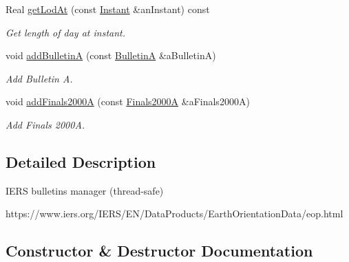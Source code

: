 \begin{DoxyCompactItemize}
Real \hyperlink{classlibrary_1_1physics_1_1coord_1_1frame_1_1provider_1_1iers_1_1_manager_a4d8b3d53fb06128050357682ee09d816}{get\+Lod\+At} (const \hyperlink{classlibrary_1_1physics_1_1time_1_1_instant}{Instant} \&an\+Instant) const
\begin{DoxyCompactList}\small\item\em Get length of day at instant. \end{DoxyCompactList}\item 
void \hyperlink{classlibrary_1_1physics_1_1coord_1_1frame_1_1provider_1_1iers_1_1_manager_a754e24a455c15f7d954718b0e6821e49}{add\+BulletinA} (const \hyperlink{classlibrary_1_1physics_1_1coord_1_1frame_1_1provider_1_1iers_1_1_bulletin_a}{BulletinA} \&a\+BulletinA)
\begin{DoxyCompactList}\small\item\em Add Bulletin A. \end{DoxyCompactList}\item 
void \hyperlink{classlibrary_1_1physics_1_1coord_1_1frame_1_1provider_1_1iers_1_1_manager_a28affac9f1340a79fc0f100af5105c42}{add\+Finals2000A} (const \hyperlink{classlibrary_1_1physics_1_1coord_1_1frame_1_1provider_1_1iers_1_1_finals2000_a}{Finals2000A} \&a\+Finals2000A)
\begin{DoxyCompactList}\small\item\em Add Finals 2000A. \end{DoxyCompactList}\end{DoxyCompactItemize}


\subsection{Detailed Description}
I\+E\+RS bulletins manager (thread-\/safe) 

https\+://www.iers.\+org/\+I\+E\+R\+S/\+E\+N/\+Data\+Products/\+Earth\+Orientation\+Data/eop.html 

\subsection{Constructor \& Destructor Documentation}
\mbox{\label{classlibrary_1_1physics_1_1coord_1_1frame_1_1provider_1_1iers_1_1_manager_a8be831f65e5851152337a19de02cf23d}} 
